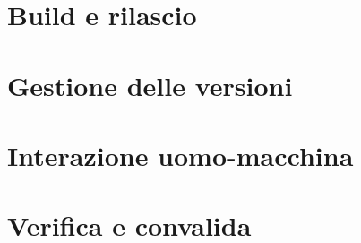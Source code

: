 \documentclass{unina_doc_class}
\begin{document}
  

  \part{Build e rilascio}

  
  

  \part{Gestione delle versioni}

  

  \part{Interazione uomo-macchina}

  

  \part{Verifica e convalida}

  
\end{document}
